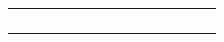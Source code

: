 \documentclass{article}
\begin{document}
\begin{table}[hb]
{\begin{tabular}{|l|l|l|l|l||l|l||l|l|l|l|l|l|}
                                                                   &        &            &         & \multirow{4}{*}{}                                        &                                                                    &                                                                  &                                                               &                                                            &                                                                             &                                                                                               \\ \cline{1-4} \cline{6-11} 
                                                                   &        &            &         &                                                          &                                                                    &                                                                  &                                                               &                                                            &                                                                             &                                                                                               \\ \cline{1-4} \cline{6-11} 
                                                                   &        &            &         &                                                          &                                                                    &                                                                  &                                                               &                                                            &                                                                             &                                                                                               \\ \cline{1-4} \cline{6-11} 
                                                                   &        &            &         &                                                          &                                                                    &                                                                  &                                                               &                                                            &                                                                             &                                                                                               \\ \hline
\end{tabular}}
\end{table}
\end{document}
